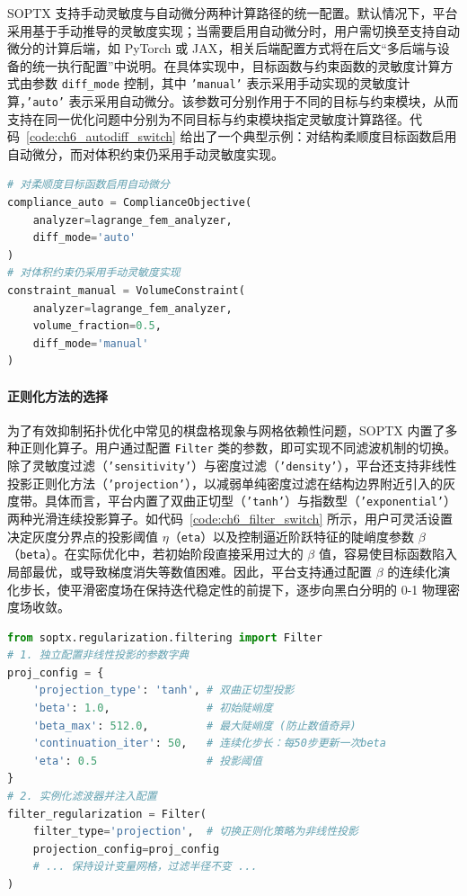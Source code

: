 SOPTX 支持手动灵敏度与自动微分两种计算路径的统一配置。默认情况下，平台采用基于手动推导的灵敏度实现；当需要启用自动微分时，用户需切换至支持自动微分的计算后端，如 PyTorch 或 JAX，相关后端配置方式将在后文“多后端与设备的统一执行配置”中说明。在具体实现中，目标函数与约束函数的灵敏度计算方式由参数 \texttt{diff\_mode} 控制，其中 \texttt{'manual'} 表示采用手动实现的灵敏度计算，\texttt{'auto'} 表示采用自动微分。该参数可分别作用于不同的目标与约束模块，从而支持在同一优化问题中分别为不同目标与约束模块指定灵敏度计算路径。代码~\ref{code:ch6_autodiff_switch} 给出了一个典型示例：对结构柔顺度目标函数启用自动微分，而对体积约束仍采用手动灵敏度实现。
\begin{lstlisting}[language=Python,
	caption={自动微分灵敏度路径的配置示例},
	label={code:ch6_autodiff_switch},
	basicstyle=\footnotesize\ttfamily,
]
# 对柔顺度目标函数启用自动微分
compliance_auto = ComplianceObjective(
	analyzer=lagrange_fem_analyzer, 
	diff_mode='auto'
)
# 对体积约束仍采用手动灵敏度实现
constraint_manual = VolumeConstraint(
	analyzer=lagrange_fem_analyzer, 
	volume_fraction=0.5,
	diff_mode='manual'
)
\end{lstlisting}

\paragraph*{正则化方法的选择}

为了有效抑制拓扑优化中常见的棋盘格现象与网格依赖性问题，SOPTX 内置了多种正则化算子。用户通过配置 \texttt{Filter} 类的参数，即可实现不同滤波机制的切换。除了灵敏度过滤（\texttt{'sensitivity'}）与密度过滤（\texttt{'density'}），平台还支持非线性投影正则化方法（\texttt{'projection'}），以减弱单纯密度过滤在结构边界附近引入的灰度带。具体而言，平台内置了双曲正切型（\texttt{'tanh'}）与指数型（\texttt{'exponential'}）两种光滑连续投影算子。如代码~\ref{code:ch6_filter_switch} 所示，用户可灵活设置决定灰度分界点的投影阈值 $\eta$（\texttt{eta}）以及控制逼近阶跃特征的陡峭度参数 $\beta$（\texttt{beta}）。在实际优化中，若初始阶段直接采用过大的 $\beta$ 值，容易使目标函数陷入局部最优，或导致梯度消失等数值困难。因此，平台支持通过配置 $\beta$ 的连续化演化步长，使平滑密度场在保持迭代稳定性的前提下，逐步向黑白分明的 0-1 物理密度场收敛。

\begin{lstlisting}[language=Python, 
	caption={正则化策略与投影参数的配置}, 
	label={code:ch6_filter_switch}, 
	basicstyle=\footnotesize\ttfamily,
]
from soptx.regularization.filtering import Filter
# 1. 独立配置非线性投影的参数字典
proj_config = {
	'projection_type': 'tanh', # 双曲正切型投影
	'beta': 1.0,               # 初始陡峭度
	'beta_max': 512.0,         # 最大陡峭度 (防止数值奇异)
	'continuation_iter': 50,   # 连续化步长：每50步更新一次beta
	'eta': 0.5                 # 投影阈值
}
# 2. 实例化滤波器并注入配置
filter_regularization = Filter(
	filter_type='projection',  # 切换正则化策略为非线性投影
	projection_config=proj_config
	# ... 保持设计变量网格，过滤半径不变 ...
)
\end{lstlisting}

